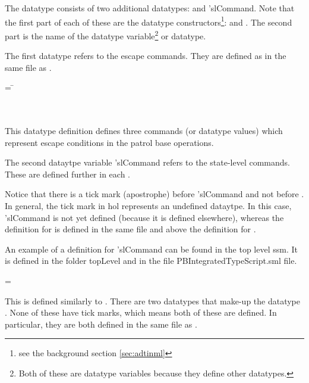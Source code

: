 \documentclass[../../main/main.tex]{subfiles}
\begin{document}
The  datatype consists of two additional datatypes:   and  'slCommand.  Note that the first part of each of these are the datatype constructors\footnote{see the background section \ref{sec:adtinml}}:  and .  The second part is the name of the datatype variable\footnote{Both of these are datatype variables because they define other datatypes.} or datatype.  

The first datatype refers to the escape commands.  They are defined as  in the same file as .

 \begin{tabbing}
  = \=  \\
 						\>\HOLTokenBar{}  \\
						\>\HOLTokenBar{} \\
           					\>\HOLTokenBar{} 
\end{tabbing}

This datatype definition defines three commands (or datatype values) which represent escape conditions in the patrol base operations.  

The second dataytpe variable 'slCommand refers to the state-level commands.  These are defined further in each .  

Notice that there is a tick mark (apostrophe) before 'slCommand and not before .  In general, the tick mark in \gls{hol} represents an undefined dataytpe.  In this case, 'slCommand is not yet defined (because it is defined elsewhere), whereas the definition for  is defined in the same file and above the definition for .   

An example of a definition for 'slCommand can be found in the top level \gls{ssm}.  It is defined in the folder topLevel and in the file PBIntegratedTypeScript.sml file.

 =   \HOLTokenBar{}  

This is defined similarly to .  There are two datatypes that make-up the datatype .  None of these have tick marks, which means both of these are defined.  In particular, they are both defined in the same file as .
\end{document}
